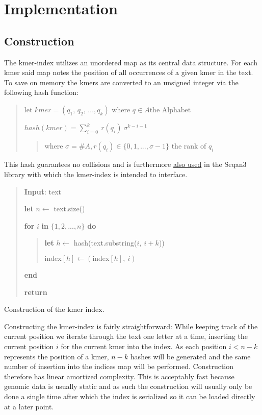 \chapter{Implementation}

\section{Construction}
The kmer-index utilizes an unordered map as its central data structure.
For each kmer said map notes the position of all occurrences of a given kmer in the text.
To save on memory the kmers are converted to an unsigned integer via
the following hash function:
\begin{verse}
let $kmer =(q_{1},\,q_{2},\,...,q_{k})$ where $q\in A \text{the Alphabet}$

$hash(kmer) = \sum_{i=0}^{k}\:r(q_{i})\:\sigma^{k-i-1}$
\begin{verse}
where $\sigma=\#A,r(q_{i})\in\{0,1,...,\sigma-1\}$ the rank of $q_{i}$
\end{verse}
\end{verse}
This hash guarantees no collisions and is furthermore
\href{http://docs.seqan.de/seqan/3-master-user/group__views.html\#ga6e598d6a021868f704d39df73252974f}{also used} in the Seqan3
library with which the kmer-index is intended to interface.

\begin{algorithm}[H]
\begin{verse}
\textbf{Input}: text

\textbf{let} $n\leftarrow$ text.size()

\textbf{for} $i$ \textbf{in} $\{1,2,...,n\}$ \textbf{do}
\begin{verse}
\textbf{let} $h\leftarrow$ hash(text.substring($i,\:i+k$))

$\text{index}[h]\leftarrow(\text{index}[h],\:i)$
\end{verse}

\textbf{end}

\textbf{return}
\end{verse}
\caption{Construction of the kmer index.}
\end{algorithm}

Constructing the kmer-index is fairly straightforward: While keeping track of the current position we iterate through the
text one letter at a time, inserting the current position $i$ for the current kmer into the index.
As each position $i<n-k$ represents the position of a kmer, $n-k$ hashes will be generated and the same number of insertion
into the indices map will be performed. Construction therefore has linear amortized complexity. This is acceptably fast because genomic data is
usually static and as such the construction will usually only be done a single time after which the index is serialized
so it can be loaded directly at a later point.
\newpage
